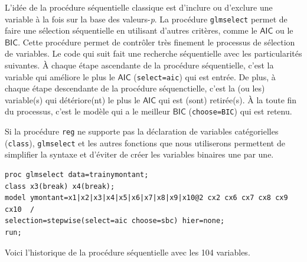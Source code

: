 \documentclass[
  11pt,
  letterpaper,
]{book}
\theoremstyle{definition}
\theoremstyle{definition}
\theoremstyle{definition}
\theoremstyle{remark}
\begin{document}
L'idée de la procédure séquentielle classique est d'inclure ou d'exclure une variable à la fois sur la base des valeurs-\emph{p}. La procédure \texttt{glmselect} permet de faire une sélection séquentielle en utilisant d'autres critères, comme le \(\mathsf{AIC}\) ou le \(\mathsf{BIC}\). Cette procédure permet de contrôler très finement le processus de sélection de variables. Le code qui suit fait une recherche séquentielle avec les particularités suivantes. À chaque étape ascendante de la procédure séquentielle, c'est la variable qui améliore le plus le \(\mathsf{AIC}\) (\texttt{select=aic}) qui est entrée. De plus, à chaque étape descendante de la procédure séquenctielle, c'est la (ou les) variable(s) qui détériore(nt) le plus le \(\mathsf{AIC}\) qui est (sont) retirée(s). À la toute fin du processus, c'est le modèle qui a le meilleur \(\mathsf{BIC}\) (\texttt{choose=BIC}) qui est retenu.

Si la procédure \texttt{reg} ne supporte pas la déclaration de variables catégorielles (\texttt{class}), \texttt{glmselect} et les autres fonctions que nous utiliserons permettent de simplifier la syntaxe et d'éviter de créer les variables binaires une par une.

\begin{verbatim}
proc glmselect data=trainymontant;
class x3(break) x4(break);
model ymontant=x1|x2|x3|x4|x5|x6|x7|x8|x9|x10@2 cx2 cx6 cx7 cx8 cx9 cx10  /   
selection=stepwise(select=aic choose=sbc) hier=none; 
run;
\end{verbatim}

Voici l'historique de la procédure séquentielle avec les 104 variables.
\end{document}

